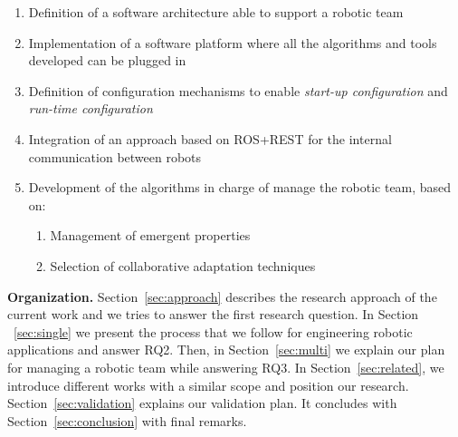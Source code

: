 \begin{enumerate}
\item Definition of a software architecture able to support a robotic team
\item Implementation of a software platform where all the algorithms and tools developed can be plugged in 
\item Definition of configuration mechanisms to enable \emph{start-up configuration} and \emph{run-time configuration}
\item Integration of an approach based on ROS+REST for the internal communication between robots
\item Development of the algorithms in charge of manage the robotic team, based on:
\begin{enumerate}
\item Management of emergent properties
\item Selection of collaborative adaptation techniques
\end{enumerate}
\end{enumerate}

\textbf{Organization.} 
Section~\ref{sec:approach} describes the research approach of the current work and we tries to answer the first research question.
In Section ~\ref{sec:single} we present the process that we follow for engineering robotic applications and answer RQ2.
Then, in Section~\ref{sec:multi} we explain our plan for managing a robotic team while answering RQ3.
In Section~\ref{sec:related}, we introduce different works with a similar scope and position our research.
Section~\ref{sec:validation} explains our validation plan.
It concludes with Section~\ref{sec:conclusion} with final remarks.